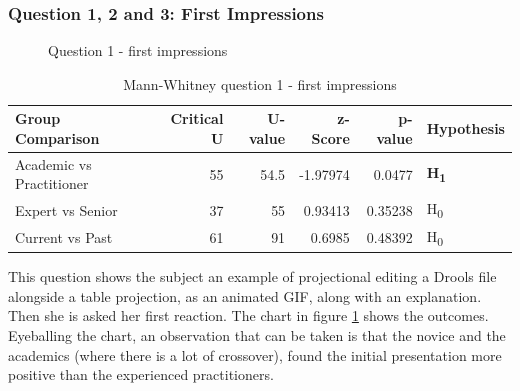 \pagebreak
\subsubsection{Question 1, 2 and 3: First Impressions}

\begin{figure}[h]
    \centering
    \caption{Question 1 - first impressions}
    \label{fig:stackedbar_Q1}
\end{figure}

\begin{table}[h]
    \begin{center}
        \begin{tabular}{ |l ||r |r |r | r|l | } 
            \hline
            Group Comparison                 & Critical U & U-value & z-Score  & p-value & Hypothesis         \\
            \hline
            \hline
            Academic vs Practitioner         & 55         & 54.5    & -1.97974 & 0.0477  & \textbf{H\textsubscript{1}}  \\ 
            \hline
            Expert vs Senior                 & 37         & 55      & 0.93413  & 0.35238 & H\textsubscript{0} \\ 
            \hline
            Current vs Past                  & 61         & 91      & 0.6985   & 0.48392 & H\textsubscript{0} \\ 
            \hline
        \end{tabular}
    \end{center}
    \caption{Mann-Whitney question 1 - first impressions}
    \label{table:mannwhitneyQ1}
\end{table}

This question shows the subject an example of projectional editing a Drools file alongside a table projection, as an animated GIF, along with an explanation.
Then she is asked her first reaction. 
The chart in figure \ref{fig:stackedbar_Q1} shows the outcomes.
Eyeballing the chart, an observation that can be taken is that the novice and the academics (where there is a lot of crossover), found the initial presentation more positive than the experienced practitioners.

